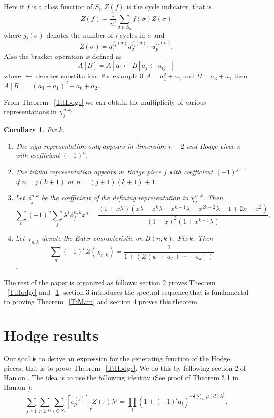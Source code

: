 \documentclass{amsart}
\newtheorem{corollary}[theorem]{Corollary}
\begin{document}
Here if $f$ is a class function of $S_n$ $Z(f)$ is the cycle indicator, that is $$Z(f) = \frac{1}{n!} \sum_{\sigma \in S_n}
 f(\sigma) Z(\sigma)$$ where $j_i(\sigma)$ denotes the number of $i$ cycles in $\sigma$ and $$Z(\sigma) = 
a_1^{j_1(\sigma)} a_2^{j_2(\sigma)} \cdots a_p^{j_p(\sigma)}.$$ Also the bracket operation is defined as $$A[B] = A[ a_i
\leftarrow B[a_j \leftarrow a_{ij}]]$$ where $\leftarrow$ denotes substitution. For example if $A = a_1^2 + a_2$ and 
$B= a_3+a_1$ then $A[B] = (a_3+a_1)^2 + a_6+a_2$. 


From Theorem ~\ref{T:Hodge} we can obtain the multiplicity of various representations in $\chi_j^{n, k}$:

\begin{corollary} \label{C:Hodge} 
  Fix $k$.
  \begin{enumerate} 
  \item The sign representation only appears in dimension $n-2$ and Hodge piece $n$ with coefficient $(-1)^n$.
  \item The trivial representation appears in Hodge piece $j$ with coefficient $(-1)^{j+1}$ if $n=j(k+1)$ or 
     	  $n=(j+1)(k+1) +1$.
  \item Let $\phi_j^{n, k}$ be the coefficient of the defining representation in $\chi_j^{n, k}$. Then 
        $$ \sum_n (-1)^n \sum_j \lambda^j \phi_j^{n, k}x^n = \frac{(1+x\lambda)(x\lambda - x^k\lambda -x^{k-1}\lambda +
        x^{2k-2}\lambda - 1 +2x -x^2)}{(1-x)^2(1+x^{k+1}\lambda)}.$$
  \item Let $\chi_{n, k}$ denote the Euler characteristic on $B(n, k)$. Fix $k$. Then $$\sum_n (-1)^n Z(\chi_{n, k}) = 
        \frac{1}{1 + (Z(a_1 + a_2 + \cdots + a_k))}$$.
  \end{enumerate} 
\end{corollary}


The rest of the paper is organized as follows: section 2 proves Theorem ~\ref{T:Hodge} and ~\ref{C:Hodge}, section 3 
introduces the spectral sequence that is fundamental to proving Theorem ~\ref{T:Main} and section 4 proves this theorem.

\section{Hodge results}\label{S:Hodge}

Our goal is to derive an expression for the generating function of the Hodge pieces, that is to prove Theorem 
~\ref{T:Hodge}. We do this by following section 2 of Hanlon \cite{Hanlon}. The idea is to use the following identity
(See proof of Theorem 2.1 in Hanlon \cite{Hanlon}):
\begin{equation} 
  \sum_{j \ge 1} \sum_{p \ge 0} \sum_{\tau \in S_p} [e_p^{(j)}]_\tau Z(\tau) \lambda^j = \prod_l (1 + (-1)^l a_l)^
  {-\frac{1}{l} \sum_{d |l} \mu(d) \lambda^{\frac{l}{d}}}.
\end{equation}
\end{document}

